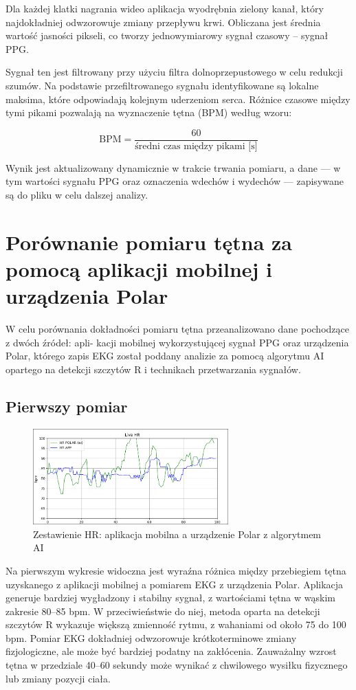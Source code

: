 \documentclass{article}
\begin{document}
Dla każdej klatki nagrania wideo aplikacja wyodrębnia zielony kanał, który najdokładniej odwzorowuje zmiany przepływu krwi. Obliczana jest średnia wartość jasności pikseli, co tworzy jednowymiarowy sygnał czasowy – sygnał PPG.

Sygnał ten jest filtrowany przy użyciu filtra dolnoprzepustowego w celu redukcji szumów. Na podstawie przefiltrowanego sygnału identyfikowane są lokalne maksima, które odpowiadają kolejnym uderzeniom serca. Różnice czasowe między tymi pikami pozwalają na wyznaczenie tętna (BPM) według wzoru:

\[
\text{BPM} = \frac{60}{\text{średni czas między pikami [s]}}
\]

Wynik jest aktualizowany dynamicznie w trakcie trwania pomiaru, a dane — w tym wartości sygnału PPG oraz oznaczenia wdechów i wydechów — zapisywane są do pliku w celu dalszej analizy.

\newpage
\section{Porównanie pomiaru tętna za pomocą aplikacji mobilnej i urządzenia Polar}
W celu porównania dokładności pomiaru tętna przeanalizowano dane pochodzące z dwóch źródeł: apli-
kacji mobilnej wykorzystującej sygnał PPG oraz urządzenia Polar, którego zapis EKG został poddany
analizie za pomocą algorytmu AI opartego na detekcji szczytów R i technikach przetwarzania sygnałów.

\subsection{Pierwszy pomiar}
\begin{figure}[h]
    \centering
    \includegraphics[width=0.67\textwidth]{image-5.png}
    \caption{Zestawienie HR: aplikacja mobilna a urządzenie Polar z algorytmem AI}
\end{figure}

Na pierwszym wykresie widoczna jest wyraźna różnica między przebiegiem tętna uzyskanego z aplikacji mobilnej a pomiarem EKG z urządzenia Polar. Aplikacja generuje bardziej wygładzony i stabilny sygnał, z wartościami tętna w wąskim zakresie 80–85 bpm. W przeciwieństwie do niej, metoda oparta na detekcji szczytów R wykazuje większą zmienność rytmu, z wahaniami od około 75 do 100 bpm. Pomiar EKG dokładniej odwzorowuje krótkoterminowe zmiany fizjologiczne, ale może być bardziej podatny na zakłócenia. Zauważalny wzrost tętna w przedziale 40–60 sekundy może wynikać z chwilowego wysiłku fizycznego lub zmiany pozycji ciała.
\end{document}
